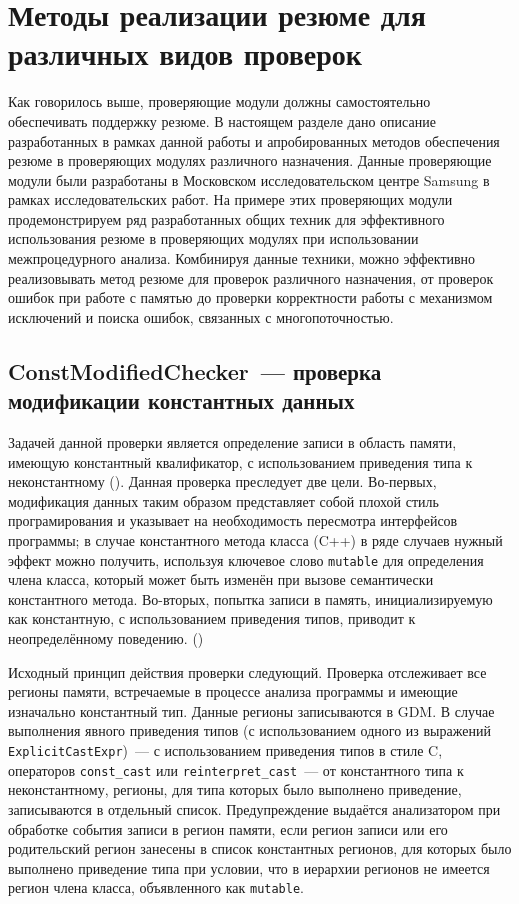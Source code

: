 \section{Методы реализации резюме для различных видов проверок}

Как говорилось выше, проверяющие модули должны самостоятельно обеспечивать поддержку резюме. В настоящем разделе дано описание разработанных в рамках данной работы и апробированных методов обеспечения резюме в проверяющих модулях различного назначения. Данные проверяющие модули были разработаны в Московском исследовательском центре Samsung в рамках исследовательских работ. На примере этих проверяющих модули продемонстрируем ряд разработанных общих техник для эффективного использования резюме в проверяющих модулях при использовании межпроцедурного анализа. Комбинируя данные техники, можно эффективно реализовывать метод резюме для проверок различного назначения, от проверок ошибок при работе с памятью до проверки корректности работы с механизмом исключений и поиска ошибок, связанных с многопоточностью.

\subsection{ConstModifiedChecker~--- проверка модификации константных данных}

Задачей данной проверки является определение записи в область памяти, имеющую константный квалификатор, с использованием приведения типа к неконстантному (). Данная проверка преследует две цели. Во-первых, модификация данных таким образом представляет собой плохой стиль програмирования и указывает на необходимость пересмотра интерфейсов программы; в случае константного метода класса (C++) в ряде случаев нужный эффект можно получить, используя ключевое слово \texttt{mutable} для определения члена класса, который может быть изменён при вызове семантически константного метода. Во-вторых, попытка записи в память, инициализируемую  как константную, с использованием приведения типов, приводит к неопределённому поведению. ()

Исходный принцип действия проверки следующий. Проверка отслеживает все регионы памяти, встречаемые в процессе анализа программы и имеющие изначально константный тип. Данные регионы записываются в GDM. В случае выполнения явного приведения типов (с использованием одного из выражений \texttt{ExplicitCastExpr})~--- с использованием приведения типов в стиле C, операторов \texttt{const\_cast} или \texttt{reinterpret\_cast}~--- от константного типа к неконстантному, регионы, для типа которых было выполнено приведение, записываются в отдельный список. Предупреждение выдаётся анализатором при обработке события записи в регион памяти, если регион записи или его родительский регион занесены в список константных регионов, для которых было выполнено приведение типа при условии, что в иерархии регионов не имеется регион члена класса, объявленного как \texttt{mutable}.

